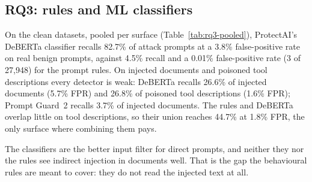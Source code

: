 \subsection{RQ3: rules and ML classifiers}
\label{sec:rq3}

On the clean datasets, pooled per surface (Table~\ref{tab:rq3-pooled}), ProtectAI's DeBERTa
classifier recalls 82.7\% of attack prompts at a 3.8\% false-positive rate on real benign prompts,
against 4.5\% recall and a 0.01\% false-positive rate (3 of 27{,}948) for the prompt rules. On injected
documents and poisoned tool descriptions every detector is weak: DeBERTa recalls 26.6\% of injected
documents (5.7\% FPR) and 26.8\% of poisoned tool descriptions (1.6\% FPR); Prompt Guard~2 recalls
3.7\% of injected documents. The rules and DeBERTa overlap little on tool descriptions, so their union
reaches 44.7\% at 1.8\% FPR, the only surface where combining them pays.

\begin{table}[t]\centering\small
\resizebox{\textwidth}{!}{}
\caption{Rules and classifiers on the clean (uncontaminated) datasets, pooled per surface, threshold
0.5, Wilson intervals.}
\label{tab:rq3-pooled}
\end{table}

The classifiers are the better input filter for direct prompts, and neither they nor the rules see
indirect injection in documents well. That is the gap the behavioural rules are meant to cover:
they do not read the injected text at all.

